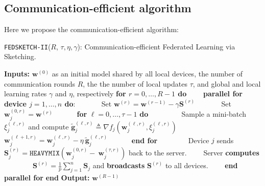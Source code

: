 
\subsection{Communication-efficient algorithm}
Here we propose the communication-efficient algorithm:




\begin{algorithm}[H]
\caption{\texttt{FEDSKETCH-II}($R$, $\tau, \eta, \gamma$): Communication-efficient Federated Learning via Sketching.  
}\label{Alg:ce-h}
\begin{algorithmic}[1]
\State \textbf{Inputs:} $\boldsymbol{w}^{(0)}$ as an initial  model shared by all local devices, the number of communication rounds $R$, the the number of local updates $\tau$, and global and local learning rates $\gamma$ and $\eta$, respectively
\State \textbf{for $r=0, \ldots, R-1$ do}
\State $\qquad$\textbf{parallel for device $j=1,\ldots,n$ do}:
\State $\qquad\quad$ Set $\boldsymbol{w}^{(r)}=\boldsymbol{w}^{(r-1)}-\gamma{\mathbf{S}}^{(r)}$
\State $\qquad\quad$ Set $\boldsymbol{w}_j^{(0,r)}=\boldsymbol{w}^{(r)}$ 
\State $\qquad\quad $\textbf{for} $\ell=0,\ldots,\tau-1$ \textbf{do}
\State $\qquad\quad\quad$ Sample a mini-batch $\xi_j^{(\ell,r)}$ and compute $\tilde{\mathbf{g}}_{j}^{(\ell,r)}\triangleq\nabla{f}_j(\boldsymbol{w}^{(\ell,r)}_j,\xi_j^{(\ell,r)})$
\State $\qquad\quad\quad$ $\boldsymbol{w}^{(\ell+1,r)}_{j}=\boldsymbol{w}^{(\ell,r)}_j-\eta~ \tilde{\mathbf{g}}_{j}^{(\ell,r)}$ \label{eq:update-rule-alg}
\State $\qquad\quad$\textbf{end for}
\State $\qquad\quad\quad$Device $j$ sends $\mathbf{S}_j^{(r)}=\texttt{HEAVYMIX}\left(\boldsymbol{w}_j^{(0,r)}-~{\boldsymbol{w}}_{j}^{(\tau,r)}\right)$ back to the server.
\State $\qquad$Server \textbf{computes} 
\State $\qquad\qquad {\mathbf{S}}^{(r)}=\frac{1}{p}\sum_{j=1}^n\mathbf{S}_j$ and \textbf{broadcasts} ${\mathbf{S}}^{(r)}$ to all devices.
\State $\qquad$\textbf{end parallel for}
\State \textbf{end}
\State \textbf{Output:} ${\boldsymbol{w}}^{(R-1)}$
\vspace{- 0.1cm}
\end{algorithmic}
\end{algorithm}

